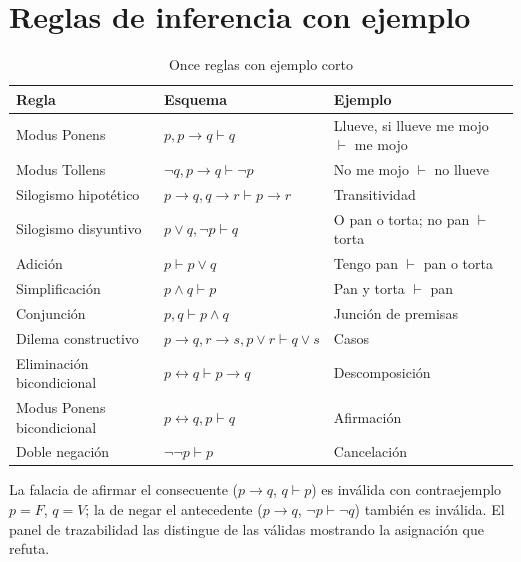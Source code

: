 \documentclass[11pt,a4paper,openany]{book}
\begin{document}
\chapter{Reglas de inferencia con ejemplo}
\label{ch:reglas-ej}
\begin{table}[H]
\centering
\caption{Once reglas con ejemplo corto}
\label{tab:reglas-ej}
\begin{tabular}{lll}
\toprule
Regla & Esquema & Ejemplo \\
\midrule
Modus Ponens & $p, p \to q \vdash q$ & Llueve, si llueve me mojo $\vdash$ me mojo \\
Modus Tollens & $\lnot q, p \to q \vdash \lnot p$ & No me mojo $\vdash$ no llueve \\
Silogismo hipot\'etico & $p \to q, q \to r \vdash p \to r$ & Transitividad \\
Silogismo disyuntivo & $p \lor q, \lnot p \vdash q$ & O pan o torta; no pan $\vdash$ torta \\
Adici\'on & $p \vdash p \lor q$ & Tengo pan $\vdash$ pan o torta \\
Simplificaci\'on & $p \land q \vdash p$ & Pan y torta $\vdash$ pan \\
Conjunci\'on & $p, q \vdash p \land q$ & Junci\'on de premisas \\
Dilema constructivo & $p \to q, r \to s, p \lor r \vdash q \lor s$ & Casos \\
Eliminaci\'on bicondicional & $p \leftrightarrow q \vdash p \to q$ & Descomposici\'on \\
Modus Ponens bicondicional & $p \leftrightarrow q, p \vdash q$ & Afirmaci\'on \\
Doble negaci\'on & $\lnot\lnot p \vdash p$ & Cancelaci\'on \\
\bottomrule
\end{tabular}
\end{table}
La falacia de afirmar el consecuente ($p \to q$, $q \vdash p$) es inv\'alida con contraejemplo $p = F$, $q = V$; la de negar el antecedente ($p \to q$, $\lnot p \vdash \lnot q$) tambi\'en es inv\'alida. El panel de trazabilidad las distingue de las v\'alidas mostrando la asignaci\'on que refuta.
\end{document}
